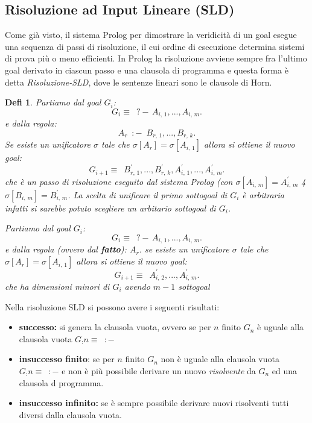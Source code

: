\documentclass[a4paper]{book}
\newtheorem*{defi}{Defi}%
\begin{document}
\subsection{Risoluzione ad Input Lineare (SLD)}
Come già visto, il sistema Prolog per dimostrare la veridicità di un goal esegue una sequenza di passi di risoluzione,
il cui ordine di esecuzione determina sistemi di prova più o meno efficienti.\newline
In Prolog la risoluzione avviene sempre fra l’ultimo goal derivato in ciascun passo e una clausola di programma
e questa forma è detta \emph{Risoluzione-SLD}, dove le sentenze lineari sono le clausole di Horn.
\begin{defi}
Partiamo dal goal $G_i$:
\begin{equation*}
  G_i\equiv \,\,\,?-\, A_{i,\, 1}, ...,  A_{i,\, m}.
\end{equation*}
e dalla regola:
\begin{equation*}
  A_r\,\,\,:-\,\,\, B_{r,\,1},..., B_{r,\,k}.
\end{equation*}
Se esiste un unificatore $\sigma$ tale che $\sigma[A_r]=\sigma[A_{i,\,1}]$ allora si ottiene il nuovo goal:
\begin{equation*}
  G_{i+1}\equiv\,\,\,B^{'}_{r,\,1},..., B^{'}_{r,\,k},A^{'}_{i,\, 1}, ...,  A^{'}_{i,\, m}.
\end{equation*}
che è un passo di risoluzione eseguito dal sistema Prolog (con $\sigma[A_{i,\,m}]=A^{'}_{i,\,m}$ 4 $\sigma[B_{i,\,m}]=B^{'}_{i,\,m}$.\newline
La scelta di unificare il primo sottogoal di $G_i$ è arbitraria infatti si sarebbe potuto scegliere un arbitario sottogoal di $G_i$.

Partiamo dal goal $G_i$:
\begin{equation*}
  G_i\equiv \,\,\,?-\, A_{i,\, 1}, ...,  A_{i,\, m}.
\end{equation*}
e dalla regola (ovvero dal \textbf{fatto}): $A_r$.
se esiste un unificatore $\sigma$ tale che $\sigma[A_r]=\sigma[A_{i,\,1}]$ allora si ottiene il nuovo goal:
\begin{equation*}
  G_{i+1}\equiv\,\,\,A^{'}_{i,\, 2}, ...,  A^{'}_{i,\, m}.
\end{equation*}
che ha dimensioni minori di $G_i$ avendo $m-1$ sottogoal
\end{defi}
Nella risoluzione SLD si possono avere i seguenti risultati:
\begin{itemize}
\item \textbf{successo:} si genera la clausola vuota, ovvero se per $n$ finito $G_n$ è uguale alla clausola vuota $G_:n\equiv\,\,\,:-$
\item \textbf{insuccesso finito}: se per $n$ finito $G_n$  non è uguale alla clausola vuota $G_:n\equiv\,\,\,:-$
              e non è più possibile derivare un nuovo \textit{risolvente} da $G_n$ ed una clausola d programma.
\item \textbf{insuccesso infinito: }se è sempre possibile derivare nuovi risolventi tutti diversi dalla clausola vuota.
\end{itemize}
\end{document}
